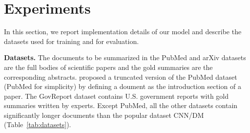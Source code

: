 \documentclass[11pt]{article}
\begin{document}
\section{Experiments}
\label{sec:experiments}
In this section, we report implementation details of our model and describe the datasets used for training and for evaluation.

\noindent \textbf{Datasets.}
The documents to be summarized in the PubMed and arXiv datasets \cite{cohan2018discourse} are the full bodies of scientific papers and the gold summaries are the corresponding abstracts. \citet{zhong2020extractive} proposed a truncated version of the PubMed dataset (PubMed for simplicity) by defining a doument as the introduction section of a paper. The GovReport dataset \cite{huang2021efficient} contains U.S. government reports with gold summaries written by experts.
Except PubMed, all the other datasets contain significantly longer documents than the popular dataset CNN/DM (Table~\ref{tab:datasets}).
\end{document}
